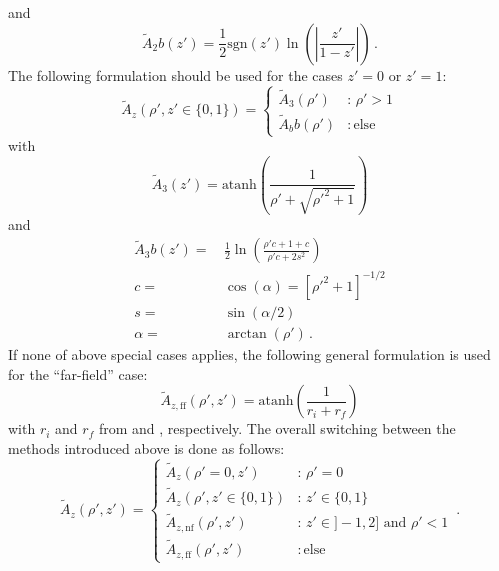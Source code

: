 and
\begin{equation}
  \tilde{A}_2b(z') = \frac{1}{2} \textrm{sgn}(z') \ln \left(\left| \frac{z'}{1-z'} \right| \right) \, .
\end{equation}
The following formulation should be used for the cases $z'=0$ or $z'=1$:
\begin{equation}
  \tilde{A}_z (\rho', z' \in \{0, 1\})
  = \begin{cases}
      \tilde{A}_3(\rho')  &:\, \rho' > 1 \\
      \tilde{A}_bb(\rho') &:\, \textrm{else}
    \end{cases}
\end{equation}
with
\begin{equation}
  \tilde{A}_3(z') = \textrm{atanh}\left( \frac{1}{\rho' + \sqrt{{\rho'}^2 + 1}} \right)
\end{equation}
and
\begin{align}
  \tilde{A}_3b(z') =&\, \frac{1}{2} \ln \left(\frac{\rho' c + 1 + c}{\rho' c + 2 s^2 }\right) \\
  c =&\, \cos(\alpha) = \left[{\rho'}^2 + 1 \right]^{-1/2} \\
  s =&\, \sin(\alpha/2)  \\
 \alpha =&\, \arctan(\rho') \, .
\end{align}
If none of above special cases applies,
the following general formulation is used for the ``far-field'' case:
\begin{equation}
  \tilde{A}_{z,\mathrm{ff}} (\rho', z') = \textrm{atanh}\left( \frac{1}{r_i + r_f} \right)
\end{equation}
with $r_i$ and $r_f$ from  and , respectively.
%
%
The overall switching between the methods introduced above is done as follows:
\begin{equation}
  \tilde{A}_z (\rho', z')
  = \begin{cases}
      \tilde{A}_z (\rho'=0, z')             &:\, \rho' = 0 \\
      \tilde{A}_z (\rho', z' \in \{0, 1\})  &:\, z' \in \{0, 1\} \\
      \tilde{A}_{z,\mathrm{nf}} (\rho', z') &:\, z' \in ]-1, 2] \textrm{ and } \rho' < 1 \\
      \tilde{A}_{z,\mathrm{ff}} (\rho', z') &:\, \textrm{else}
    \end{cases} \, .
\end{equation}

